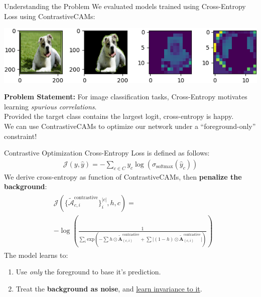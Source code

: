 \documentclass{beamer}
\begin{document}
\begin{frame}{Understanding the Problem}
	We evaluated models trained using Cross-Entropy Loss using ContrastiveCAMs:

	\begin{center}
		\includegraphics[width=\textwidth]{img/default.png}
	\end{center} \pause

	\textbf{Problem Statement:} For image classification tasks, Cross-Entropy motivates learning \textit{spurious correlations}. \pause \newline \\

	Provided the target class contains the largest logit, cross-entropy is happy. \pause \newline \\

	We can use ContrastiveCAMs to optimize our network under a ``foreground-only'' constraint!
\end{frame}

\begin{frame}{Contrastive Optimization}
	Cross-Entropy Loss is defined as follows:
	\begin{gather}
		\mathcal{J}(y, \hat{y}) = - \sum_{c \in C} y_c \log(\sigma_{\text{softmax}}(\hat{y}_c))
	\end{gather} \pause
	We derive cross-entropy as function of ContrastiveCAMs, then \textbf{penalize the background}:
	\begin{gather}
		\begin{split}
			&\mathcal{J}(\{\tilde{\mathcal{A}}_{c, i}^{\text{contrastive}}\}_i^{|c|}, h, c) = \\
			&-\log \left( \frac{1}{\sum_i \text{exp}\left({-\sum^{}h \odot \tilde{\mathcal{\bm{A}}}^{\text{contrastive}}_{(c, i)} + \sum |(1-h) \odot \tilde{\mathcal{\bm{A}}}^{\text{contrastive}}_{(c, i)}}|\right)} \right)
		\end{split}
	\end{gather} \pause
	The model learns to:
	\begin{enumerate}[label=\arabic*.]
		\item Use \textit{only} the foreground to base it's prediction.
		\item Treat the \textbf{background as noise}, and \underline{learn invariance to it}.
	\end{enumerate}
\end{frame}
\end{document}
